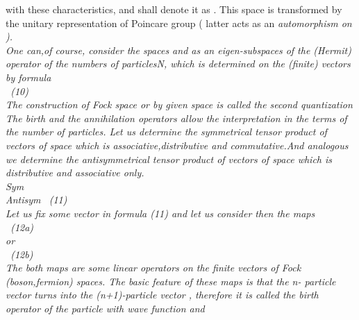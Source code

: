 \documentclass[a4paper,12pt] {article}
\begin{document}
with these  characteristics, and shall denote it as \coordHE{} .
This space is transformed by the unitary representation of Poincare group ( latter acts as an
\it automorphism \rm on \coordHE{}  ).\\ One can,of course, consider the  spaces
\coordHE{}  and  \coordHE{}  as an  \it eigen-subspaces of the
 (Hermit) operator of the numbers of particles\rm N, which is determined on the (finite) vectors by
 formula\\\coordHE{} \ (10) \\ \it The construction of Fock space  \coordHE{}  \it or
 \coordHE{} \it  by given space \coordHE{}  \it is called the second quantization\\ \rm The  birth and the annihilation  operators allow the interpretation  in the terms of the number of particles.
 Let us determine the symmetrical tensor product of vectors  \myHighlight{$\Phi, \Psi$}\coordHE{} of  space
\coordHE{} which is  \it associative,distributive and commutative.\rm And analogous
 we determine the antisymmetrical  tensor product of vectors  \myHighlight{$\Phi, \Psi$}\coordHE{} of  space
 \coordHE{} which is  \it  distributive and associative only.
\\\myHighlight{$ \Phi \vee \Psi = $}\coordHE{} \rm Sym \myHighlight{$ \Phi\bigotimes \Psi $}\coordHE{} \\\myHighlight{$\Phi \wedge \Psi =
$}\coordHE{} \rm Antisym \myHighlight{$ \Phi\bigotimes \Psi $}\coordHE{} \rm \ (11)\\  Let us fix  some vector \myHighlight{$\Phi$}\coordHE{} in formula (11) and let us
 consider then the maps  \\\coordHE{}\  (12a) \\or \\
\coordHE{}\ (12b)
\\ The both maps are some linear operators on the finite vectors  \myHighlight{$\Phi$}\coordHE{} of Fock (boson,fermion) spaces.
 The basic feature of these maps is that  \it the \rm  n- \it particle vector \it turns into the \rm  (n+1)-\it particle
 vector , \rm therefore it is called \it the  birth operator of  the particle with wave function \myHighlight{$\Phi$}\coordHE{} \rm  and
\end{document}
